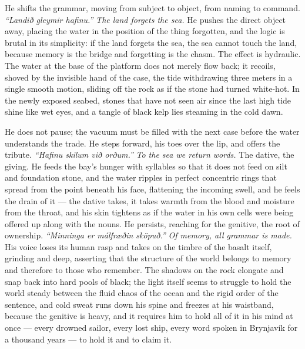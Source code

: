 \documentclass[11pt,oneside]{book}
\begin{document}
He shifts the grammar, moving from subject to object, from naming to
command. \emph{``Landið gleymir hafinu.''} \emph{The land forgets the
sea.} He pushes the direct object away, placing the water in the
position of the thing forgotten, and the logic is brutal in its
simplicity: if the land forgets the sea, the sea cannot touch the land,
because memory is the bridge and forgetting is the chasm. The effect is
hydraulic. The water at the base of the platform does not merely flow
back; it recoils, shoved by the invisible hand of the case, the tide
withdrawing three meters in a single smooth motion, sliding off the rock
as if the stone had turned white-hot. In the newly exposed seabed,
stones that have not seen air since the last high tide shine like wet
eyes, and a tangle of black kelp lies steaming in the cold dawn.

He does not pause; the vacuum must be filled with the next case before
the water understands the trade. He steps forward, his toes over the
lip, and offers the tribute. \emph{``Hafinu skilum við orðum.''}
\emph{To the sea we return words.} The dative, the giving. He feeds the
bay's hunger with syllables so that it does not feed on silt and
foundation stone, and the water ripples in perfect concentric rings that
spread from the point beneath his face, flattening the incoming swell,
and he feels the drain of it --- the dative takes, it takes warmth from
the blood and moisture from the throat, and his skin tightens as if the
water in his own cells were being offered up along with the nouns. He
persists, reaching for the genitive, the root of ownership.
\emph{``Minninga er málfræðin sköpuð.''} \emph{Of memory, all grammar is
made.} His voice loses its human rasp and takes on the timbre of the
basalt itself, grinding and deep, asserting that the structure of the
world belongs to memory and therefore to those who remember. The shadows
on the rock elongate and snap back into hard pools of black; the light
itself seems to struggle to hold the world steady between the fluid
chaos of the ocean and the rigid order of the sentence, and cold sweat
runs down his spine and freezes at his waistband, because the genitive
is heavy, and it requires him to hold all of it in his mind at once ---
every drowned sailor, every lost ship, every word spoken in Brynjavík
for a thousand years --- to hold it and to claim it.
\end{document}
